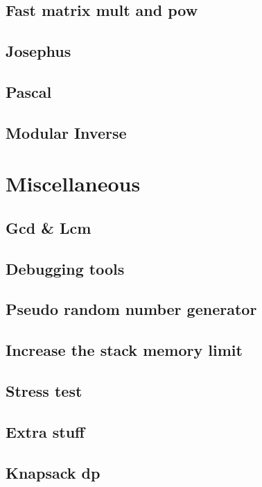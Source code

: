 \subsection{Fast matrix mult and pow}
\raggedbottom
\hrulefill
\subsection{Josephus}
\raggedbottom
\hrulefill
\subsection{Pascal}
\raggedbottom
\hrulefill
\subsection{Modular Inverse}
\raggedbottom
\hrulefill
\section{Miscellaneous}
\subsection{Gcd \& Lcm}
\raggedbottom
\hrulefill
\subsection{Debugging tools}
\raggedbottom
\hrulefill
\subsection{Pseudo random number generator}
\raggedbottom
\hrulefill
\subsection{Increase the stack memory limit}
\raggedbottom
\hrulefill
\subsection{Stress test}
\raggedbottom
\hrulefill

\subsection{Extra stuff}
\raggedbottom 
\hrulefill

\subsection{Knapsack dp}
\raggedbottom
\hrulefill
